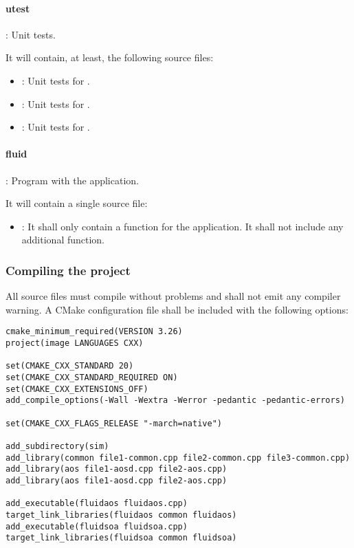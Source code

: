 \paragraph{utest}: Unit tests.

It will contain, at least, the following source files:
\begin{itemize}
  \item {}: 
        Unit tests for .
  \item {}:
        Unit tests for .
  \item {}:
        Unit tests for .
\end{itemize}

\paragraph{fluid}: Program with the application.

It will contain a single source file:
\begin{itemize}
  \item {}: 
        It shall only contain a  function for the application.
        It shall not include any additional function.
\end{itemize}

\subsubsection{Compiling the project}

All source files must compile without problems and shall not emit any compiler warning.
A CMake configuration file shall be included with the following options:

\begin{lstlisting}[title={CmakeLists.txt},frame=single]
cmake_minimum_required(VERSION 3.26)
project(image LANGUAGES CXX)

set(CMAKE_CXX_STANDARD 20)
set(CMAKE_CXX_STANDARD_REQUIRED ON)
set(CMAKE_CXX_EXTENSIONS_OFF)
add_compile_options(-Wall -Wextra -Werror -pedantic -pedantic-errors)

set(CMAKE_CXX_FLAGS_RELEASE "-march=native")

add_subdirectory(sim)
add_library(common file1-common.cpp file2-common.cpp file3-common.cpp)
add_library(aos file1-aosd.cpp file2-aos.cpp)
add_library(aos file1-aosd.cpp file2-aos.cpp)

add_executable(fluidaos fluidaos.cpp)
target_link_libraries(fluidaos common fluidaos)
add_executable(fluidsoa fluidsoa.cpp)
target_link_libraries(fluidsoa common fluidsoa)
\end{lstlisting}

